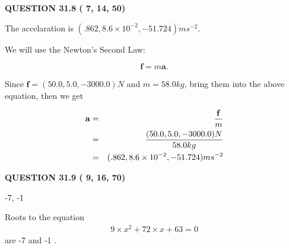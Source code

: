 \documentclass[12pt]{article}
\begin{document}
\noindent{}

 
 
  
\vspace{0.2in}
  
{\textbf{\Large{QUESTION
31.8 
 (          7,         14,         50)
}}}
  
  
 
 
\noindent{}
 
 
  The accelaration is $  %
(
.862,
8.6 \times 10^{-2},
-51.724)
ms^{-2} $.
 
 
 
 
 
 
\noindent{}

We will use the Newton's Second Law:
 
\[
\mathbf{f}=m\mathbf{a}.
\]
 
Since $\mathbf{f}= %
(50.0 , 5.0 , -3000.0) N$
and $m= %
58.0kg$, bring them into the above equation, then we get
 
\begin{eqnarray*}
\mathbf{a}&=&\frac{\mathbf{f}}m  \\
&=&\frac{ %
(50.0 , 5.0 , -3000.0) N}{ %
58.0kg}  \\
&=& %
(.862 , 8.6 \times 10^{-2} , -51.724) ms^{-2}
\end{eqnarray*}
 
 
 
  
\vspace{0.2in}
  
{\textbf{\Large{QUESTION
31.9 
 (          9,         16,         70)
}}}
  
  


 
 
\noindent{}

-7,  %
-1
 
 
 
 
 
\noindent{}

Roots to the equation
\begin{eqnarray*}
9 \times x^2  %
+  %
72
                 \times x    %
+  %
63 =0
\end{eqnarray*}
are  %
-7 and  %
-1 .
 
\end{document}
